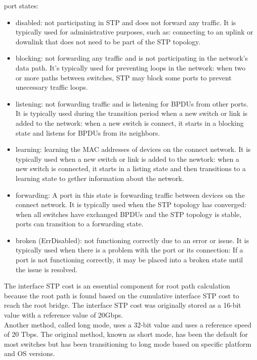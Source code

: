 \documentclass{article}
\begin{document}
port states:
	\begin{itemize}
		\item disabled: not participating in STP and does not forward any traffic. It is typically used for administrative purposes, such as: connecting to an uplink or downlink that does not need to be part of the STP topology. 
		\item blocking: not forwarding any traffic and is not participating in the network's data path. It's typically used for preventing loops in the network: when two or more paths between switches, STP may block some ports to prevent unecessary traffic loops.
		\item listening: not forwarding traffic and is listening for BPDUs from other ports. It is typically used during the transition period when a new switch or link is added to the network: when a new switch is connect, it starts in a blocking state and listens for BPDUs from its neighbors.
		\item learning: learning the MAC addresses of devices on the connect network. It is typically used when a new switch or link is added to the newtork: when a new switch is connected, it starts in a listing state and then transitions to a learning state to gether information about the network.
		\item forwarding: A port in this state is forwarding traffic between devices on the connect network. It is typically used when the STP topology has converged: when all switches have exchanged BPDUs and the STP topology is stable, ports can transition to a forwarding state.
		\item broken (ErrDisabled): not functioning correctly due to an error or issue. It is typically used when there is a problem with the port or its connection: If a port is not functioning correctly, it may be placed into a broken state until the issue is resolved.
	\end{itemize}

The interface STP cost is an essential component for root path calculation because the root path is found based on the cumulative interface STP cost to reach the root bridge. The interface STP cost was originally stored as a 16-bit value with a reference value of 20Gbps.\\

Another method, called long mode, uses a 32-bit value and uses a reference speed of 20 Tbps. The original method, known as short mode, has been the default for most switches but has been transitioning to long mode based on specific platform and OS versions.\\
\end{document}
